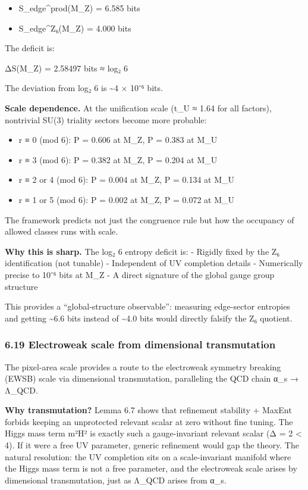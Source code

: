\documentclass[11pt,a4paper]{article}
\theoremstyle{remark}
\providecommand{\tightlist}{%
  \setlength{\itemsep}{0pt}\setlength{\parskip}{0pt}}
\begin{document}
\begin{itemize}
\tightlist
\item
  S\_edge\^{}prod(M\_Z) = 6.585 bits
\item
  S\_edge\^{}Z₆(M\_Z) = 4.000 bits
\end{itemize}

The deficit is:

ΔS(M\_Z) = 2.58497 bits ≈ log₂ 6

The deviation from log₂ 6 is \textasciitilde4 × 10⁻⁶ bits.

\textbf{Scale dependence.} At the unification scale (t\_U ≈ 1.64 for all
factors), nontrivial SU(3) triality sectors become more probable:

\begin{itemize}
\tightlist
\item
  r ≡ 0 (mod 6): P = 0.606 at M\_Z, P = 0.383 at M\_U
\item
  r ≡ 3 (mod 6): P = 0.382 at M\_Z, P = 0.204 at M\_U
\item
  r ≡ 2 or 4 (mod 6): P = 0.004 at M\_Z, P = 0.134 at M\_U
\item
  r ≡ 1 or 5 (mod 6): P = 0.002 at M\_Z, P = 0.072 at M\_U
\end{itemize}

The framework predicts not just the congruence rule but how the occupancy
of allowed classes runs with scale.

\textbf{Why this is sharp.} The log₂ 6 entropy deficit is:
- Rigidly fixed by the Z₆ identification (not tunable)
- Independent of UV completion details
- Numerically precise to 10⁻⁶ bits at M\_Z
- A direct signature of the global gauge group structure

This provides a ``global-structure observable'': measuring edge-sector
entropies and getting \textasciitilde6.6 bits instead of \textasciitilde4.0 bits would
directly falsify the Z₆ quotient.

\subsubsection{6.19 Electroweak scale from dimensional transmutation}\label{electroweak-scale-from-dimensional-transmutation}

The pixel-area scale provides a route to the electroweak symmetry breaking
(EWSB) scale via dimensional transmutation, paralleling the QCD chain
α\_s → Λ\_QCD.

\textbf{Why transmutation?} Lemma 6.7 shows that refinement stability + MaxEnt forbids
keeping an unprotected relevant scalar at zero without fine tuning. The Higgs
mass term m²\textbar H\textbar² is exactly such a gauge-invariant relevant scalar (Δ = 2 \textless{} 4).
If it were a free UV parameter, generic refinement would gap the theory.
The natural resolution: the UV completion sits on a scale-invariant manifold
where the Higgs mass term is not a free parameter, and the electroweak scale
arises by dimensional transmutation, just as Λ\_QCD arises from α\_s.
\end{document}
